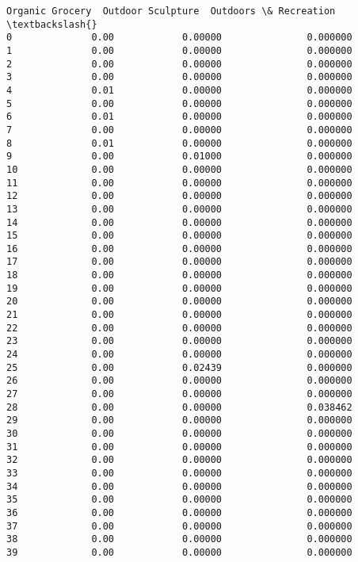 \documentclass[11pt]{article}
\begin{document}
\begin{tcolorbox}[breakable, size=fbox, boxrule=.5pt, pad at break*=1mm, opacityfill=0]
\begin{Verbatim}[commandchars=\\\{\}]
    Organic Grocery  Outdoor Sculpture  Outdoors \& Recreation  \textbackslash{}
0              0.00            0.00000               0.000000
1              0.00            0.00000               0.000000
2              0.00            0.00000               0.000000
3              0.00            0.00000               0.000000
4              0.01            0.00000               0.000000
5              0.00            0.00000               0.000000
6              0.01            0.00000               0.000000
7              0.00            0.00000               0.000000
8              0.01            0.00000               0.000000
9              0.00            0.01000               0.000000
10             0.00            0.00000               0.000000
11             0.00            0.00000               0.000000
12             0.00            0.00000               0.000000
13             0.00            0.00000               0.000000
14             0.00            0.00000               0.000000
15             0.00            0.00000               0.000000
16             0.00            0.00000               0.000000
17             0.00            0.00000               0.000000
18             0.00            0.00000               0.000000
19             0.00            0.00000               0.000000
20             0.00            0.00000               0.000000
21             0.00            0.00000               0.000000
22             0.00            0.00000               0.000000
23             0.00            0.00000               0.000000
24             0.00            0.00000               0.000000
25             0.00            0.02439               0.000000
26             0.00            0.00000               0.000000
27             0.00            0.00000               0.000000
28             0.00            0.00000               0.038462
29             0.00            0.00000               0.000000
30             0.00            0.00000               0.000000
31             0.00            0.00000               0.000000
32             0.00            0.00000               0.000000
33             0.00            0.00000               0.000000
34             0.00            0.00000               0.000000
35             0.00            0.00000               0.000000
36             0.00            0.00000               0.000000
37             0.00            0.00000               0.000000
38             0.00            0.00000               0.000000
39             0.00            0.00000               0.000000


\end{Verbatim}
\end{tcolorbox}
\end{document}
